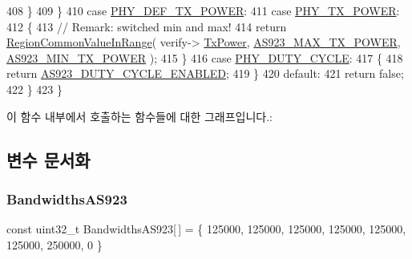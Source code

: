 \begin{DoxyCode}
408             \}
409         \}
410         \textcolor{keywordflow}{case} \mbox{\hyperlink{group___r_e_g_i_o_n_gga51cbe8f5433d914fe9cf81b451de2c2da18ae0d314f20c212f9e40207099ab1bb}{PHY\_DEF\_TX\_POWER}}:
411         \textcolor{keywordflow}{case} \mbox{\hyperlink{group___r_e_g_i_o_n_gga51cbe8f5433d914fe9cf81b451de2c2da0dceb30b79f1bae301afd5406a86d6f3}{PHY\_TX\_POWER}}:
412         \{
413             \textcolor{comment}{// Remark: switched min and max!}
414             \textcolor{keywordflow}{return} \mbox{\hyperlink{group___r_e_g_i_o_n_c_o_m_m_o_n_gafdd1c80d953e18d755a631b72a9c3bd3}{RegionCommonValueInRange}}( verify->
      \mbox{\hyperlink{unionu_verify_params_a037b4f849fa8ed4aa1d3c58aef2b28ec}{TxPower}}, \mbox{\hyperlink{group___r_e_g_i_o_n_a_s923_ga572944e6a8933722a954e4cee98fa0ee}{AS923\_MAX\_TX\_POWER}}, \mbox{\hyperlink{group___r_e_g_i_o_n_a_s923_gab5c796398b9a3a599d43ce34dd0e3dec}{AS923\_MIN\_TX\_POWER}} );
415         \}
416         \textcolor{keywordflow}{case} \mbox{\hyperlink{group___r_e_g_i_o_n_gga51cbe8f5433d914fe9cf81b451de2c2dac66308571e624ecc28c79ee0deab8cf0}{PHY\_DUTY\_CYCLE}}:
417         \{
418             \textcolor{keywordflow}{return} \mbox{\hyperlink{group___r_e_g_i_o_n_a_s923_ga9a38122696d349e600de24f267340b93}{AS923\_DUTY\_CYCLE\_ENABLED}};
419         \}
420         \textcolor{keywordflow}{default}:
421             \textcolor{keywordflow}{return} \textcolor{keyword}{false};
422     \}
423 \}
\end{DoxyCode}
이 함수 내부에서 호출하는 함수들에 대한 그래프입니다.\+:


\subsection{변수 문서화}
\mbox{\label{group___r_e_g_i_o_n_a_s923_ga38ad3de1f1f256044b1ab27bae713dd3}} 
\subsubsection{\texorpdfstring{Bandwidths\+A\+S923}{BandwidthsAS923}}
{\footnotesize\ttfamily const uint32\+\_\+t Bandwidths\+A\+S923\mbox{[}$\,$\mbox{]} = \{ 125000, 125000, 125000, 125000, 125000, 125000, 250000, 0 \}\hspace{0.3cm}{\ttfamily [static]}}

